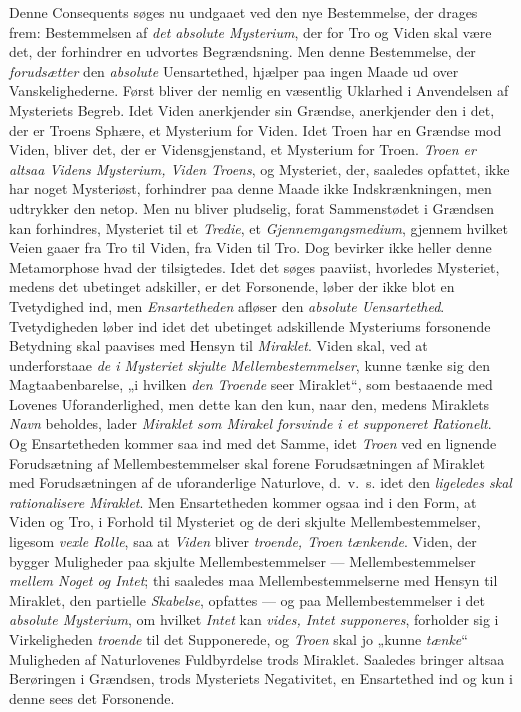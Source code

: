 \documentclass[12pt,a4paper]{book}
\newcommand{\opage}[1]{\marginnote{\footnotesize\textit{[#1]}}}
\begin{document}
Denne Consequents søges nu undgaaet ved den nye Bestemmelse, der drages frem: Bestemmelsen af
\emph{det absolute Mysterium}, der for Tro og Viden skal være det, der forhindrer en udvortes
Begrændsning. Men denne Bestemmelse, der \emph{forudsætter} den \emph{absolute} Uensartethed, hjælper
paa ingen Maade ud over Vanskelighederne. Først bliver der nemlig en væsentlig Uklarhed i
Anvendelsen af Mysteriets Begreb. Idet Viden anerkjender sin Grændse, anerkjender den i det,
der er Troens Sphære, et Mysterium for Viden. Idet Troen har en Grændse mod Viden, bliver det,
der er Vidensgjenstand, et Mysterium for Troen. \emph{Troen er altsaa Videns Mysterium, Viden
Troens}, og Mysteriet, der, saaledes opfattet, ikke har noget Mysteriøst, forhindrer paa denne
Maade ikke Indskrænkningen, men udtrykker den netop. Men nu bliver pludselig, forat
Sammenstødet i Grændsen kan forhindres, Mysteriet til et \emph{Tredie}, et \emph{Gjennemgangsmedium},
gjennem hvilket Veien gaaer fra Tro til Viden, fra Viden til Tro. Dog bevirker ikke heller
denne Metamorphose hvad der tilsigtedes. Idet det søges paaviist, hvorledes Mysteriet, medens
det ubetinget adskiller, er det Forsonende, løber der ikke blot en Tvetydighed ind, men
\emph{Ensartetheden} afløser den \emph{absolute Uensartethed}. Tvetydigheden løber ind idet det
ubetinget adskillende Mysteriums \opage{185}forsonende Betydning skal paavises med Hensyn til \emph{Miraklet}.
Viden skal, ved at underforstaae \emph{de i Mysteriet skjulte Mellembestemmelser}, kunne tænke sig
den Magtaabenbarelse, „i hvilken \emph{den Troende} seer Miraklet“, som bestaaende med Lovenes
Uforanderlighed, men dette kan den kun, naar den, medens Miraklets \emph{Navn} beholdes, lader
\emph{Miraklet som Mirakel forsvinde i et supponeret Rationelt}. Og Ensartetheden kommer saa
ind med det Samme, idet \emph{Troen} ved en lignende Forudsætning af Mellembestemmelser skal forene
Forudsætningen af Miraklet med Forudsætningen af de uforanderlige Naturlove, d.\ v.\ s. idet
den \emph{ligeledes skal rationalisere Miraklet}. Men Ensartetheden kommer ogsaa ind i den
Form, at Viden og Tro, i Forhold til Mysteriet og de deri skjulte Mellembestemmelser, ligesom
\emph{vexle Rolle}, saa at \emph{Viden} bliver \emph{troende, Troen tænkende}. Viden, der bygger Muligheder
paa skjulte Mellembestemmelser --- Mellembestemmelser \emph{mellem Noget og Intet}; thi
saaledes maa Mellembestemmelserne med Hensyn til Miraklet, den partielle \emph{Skabelse}, opfattes
--- og paa Mellembestemmelser i det \emph{absolute Mysterium}, om hvilket \emph{Intet} kan \emph{vides, Intet supponeres}, forholder sig i Virkeligheden \emph{troende} til det Supponerede, og \emph{Troen} skal jo „kunne \emph{tænke}“ Muligheden af Naturlovenes Fuldbyrdelse trods Miraklet. Saaledes bringer altsaa
Berøringen i Grændsen, trods Mysteriets Negativitet, en Ensartethed ind og kun i denne sees
det Forsonende.
\end{document}
